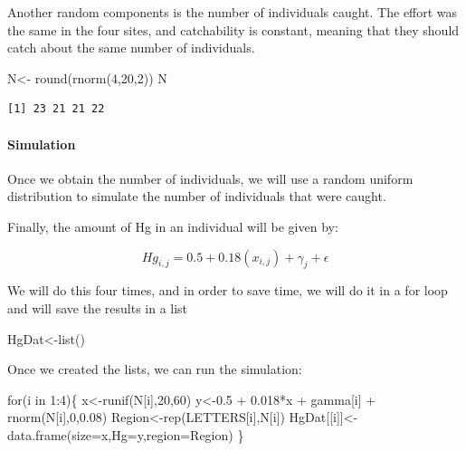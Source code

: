 \documentclass[
  letterpaper,
  DIV=11,
  numbers=noendperiod]{scrartcl}
\let\oldparagraph\paragraph
\renewcommand{\paragraph}[1]{\oldparagraph{#1}\mbox{}}
\newenvironment{Shaded}{\begin{snugshade}}{\end{snugshade}}
\newcommand{\AttributeTok}[1]{\textcolor[rgb]{0.40,0.45,0.13}{#1}}
\newcommand{\ControlFlowTok}[1]{\textcolor[rgb]{0.00,0.23,0.31}{#1}}
\newcommand{\DecValTok}[1]{\textcolor[rgb]{0.68,0.00,0.00}{#1}}
\newcommand{\FloatTok}[1]{\textcolor[rgb]{0.68,0.00,0.00}{#1}}
\newcommand{\FunctionTok}[1]{\textcolor[rgb]{0.28,0.35,0.67}{#1}}
\newcommand{\NormalTok}[1]{\textcolor[rgb]{0.00,0.23,0.31}{#1}}
\newcommand{\OtherTok}[1]{\textcolor[rgb]{0.00,0.23,0.31}{#1}}
\newcommand{\SpecialCharTok}[1]{\textcolor[rgb]{0.37,0.37,0.37}{#1}}
\begin{document}
Another random components is the number of individuals caught. The
effort was the same in the four sites, and catchability is constant,
meaning that they should catch about the same number of individuals.

\begin{Shaded}
\begin{Highlighting}[]
\NormalTok{N}\OtherTok{\textless{}{-}} \FunctionTok{round}\NormalTok{(}\FunctionTok{rnorm}\NormalTok{(}\DecValTok{4}\NormalTok{,}\DecValTok{20}\NormalTok{,}\DecValTok{2}\NormalTok{))}
\NormalTok{N}
\end{Highlighting}
\end{Shaded}

\begin{verbatim}
[1] 23 21 21 22
\end{verbatim}

\paragraph{Simulation}\label{simulation}

Once we obtain the number of individuals, we will use a random uniform
distribution to simulate the number of individuals that were caught.

Finally, the amount of Hg in an individual will be given by:

\[
Hg_{i,j} = 0.5+0.18(x_{i,j}) + \gamma_j + \epsilon
\]

We will do this four times, and in order to save time, we will do it in
a for loop and will save the results in a list

\begin{Shaded}
\begin{Highlighting}[]
\NormalTok{HgDat}\OtherTok{\textless{}{-}}\FunctionTok{list}\NormalTok{()}
\end{Highlighting}
\end{Shaded}

Once we created the lists, we can run the simulation:

\begin{Shaded}
\begin{Highlighting}[]
\ControlFlowTok{for}\NormalTok{(i }\ControlFlowTok{in} \DecValTok{1}\SpecialCharTok{:}\DecValTok{4}\NormalTok{)\{}
\NormalTok{  x}\OtherTok{\textless{}{-}}\FunctionTok{runif}\NormalTok{(N[i],}\DecValTok{20}\NormalTok{,}\DecValTok{60}\NormalTok{)}
\NormalTok{  y}\OtherTok{\textless{}{-}}\FloatTok{0.5} \SpecialCharTok{+} \FloatTok{0.018}\SpecialCharTok{*}\NormalTok{x }\SpecialCharTok{+}\NormalTok{ gamma[i] }\SpecialCharTok{+} \FunctionTok{rnorm}\NormalTok{(N[i],}\DecValTok{0}\NormalTok{,}\FloatTok{0.08}\NormalTok{)}
\NormalTok{  Region}\OtherTok{\textless{}{-}}\FunctionTok{rep}\NormalTok{(LETTERS[i],N[i])}
\NormalTok{  HgDat[[i]]}\OtherTok{\textless{}{-}}\FunctionTok{data.frame}\NormalTok{(}\AttributeTok{size=}\NormalTok{x,}\AttributeTok{Hg=}\NormalTok{y,}\AttributeTok{region=}\NormalTok{Region)}
\NormalTok{\}}
\end{Highlighting}
\end{Shaded}
\end{document}

